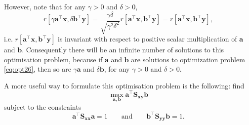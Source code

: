 \documentclass[]{book}
\theoremstyle{definition}
\theoremstyle{definition}
\theoremstyle{definition}
\theoremstyle{remark}
\begin{document}
However, note that for any \(\gamma>0\) and \(\delta>0\),
\begin{equation}
  r[\gamma\boldsymbol a^\top \boldsymbol x, \delta \boldsymbol b^\top \boldsymbol y]= \frac{\gamma \delta}{\sqrt{\gamma^2 \delta^2}}r[\boldsymbol a^\top \boldsymbol x,\boldsymbol b^\top \boldsymbol y]=r[\boldsymbol a^\top \boldsymbol x,\boldsymbol b^\top \boldsymbol y],
  \label{eq:invar}
  \end{equation}
i.e. \(r[\boldsymbol a^\top \boldsymbol x,\boldsymbol b^\top \boldsymbol y]\) is invariant with respect to positive scalar multiplication of \(\boldsymbol a\) and \(\boldsymbol b\). Consequently there will be an infinite number of solutions to this optimisation problem, because if \(\boldsymbol a\) and \(\boldsymbol b\) are solutions to optimization problem \eqref{eq:opt26}, then so are \(\gamma \boldsymbol a\) and \(\delta \boldsymbol b\), for any \(\gamma>0\) and \(\delta>0\).

A more useful way to formulate this optimisation problem is the following: find
\begin{equation}
\max_{\boldsymbol a, \boldsymbol b} \boldsymbol a^\top \boldsymbol S_{\boldsymbol x\boldsymbol y}\boldsymbol b
\label{eq:opt27a}
\end{equation}
subject to the constraints
\begin{equation}
\boldsymbol a^\top \boldsymbol S_{\boldsymbol x\boldsymbol x}\boldsymbol a=1 \qquad \text{and} \qquad \boldsymbol b^\top \boldsymbol S_{\boldsymbol y\boldsymbol y}\boldsymbol b=1.
\label{eq:opt27b}
\end{equation}
\end{document}
